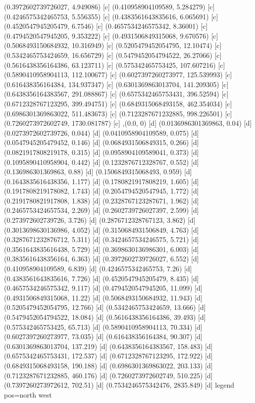 {{{(0.3972602739726027, 4.949086) [c] 
(0.410958904109589, 5.284279) [c] 
(0.4246575342465753, 5.556355) [c] 
(0.4383561643835616, 6.065691) [c] 
(0.4520547945205479, 6.7546) [c] 
(0.4657534246575342, 8.36001) [c] 
(0.4794520547945205, 9.353222) [c] 
(0.4931506849315068, 9.670576) [c] 
(0.5068493150684932, 10.316949) [c] 
(0.5205479452054795, 12.10474) [c] 
(0.5342465753424659, 16.656729) [c] 
(0.5479452054794522, 26.27066) [c] 
(0.5616438356164386, 63.123711) [c] 
(0.575342465753425, 107.607216) [c] 
(0.5890410958904113, 112.100677) [c] 
(0.6027397260273977, 125.539993) [c] 
(0.616438356164384, 134.937347) [c] 
(0.6301369863013704, 141.209305) [c] 
(0.6438356164383567, 291.088867) [c] 
(0.6575342465753431, 396.52594) [c] 
(0.6712328767123295, 399.494751) [c] 
(0.6849315068493158, 462.354034) [c] 
(0.6986301369863022, 511.483673) [c] 
(0.7123287671232885, 998.226501) [c] 
(0.7260273972602749, 1730.081787) [c] 
},{(0.0, 0) [d] 
(0.0136986301369863, 0.04) [d] 
(0.0273972602739726, 0.044) [d] 
(0.0410958904109589, 0.075) [d] 
(0.0547945205479452, 0.146) [d] 
(0.0684931506849315, 0.266) [d] 
(0.0821917808219178, 0.315) [d] 
(0.0958904109589041, 0.373) [d] 
(0.1095890410958904, 0.442) [d] 
(0.1232876712328767, 0.552) [d] 
(0.136986301369863, 0.88) [d] 
(0.1506849315068493, 0.959) [d] 
(0.1643835616438356, 1.177) [d] 
(0.1780821917808219, 1.605) [d] 
(0.1917808219178082, 1.743) [d] 
(0.2054794520547945, 1.772) [d] 
(0.2191780821917808, 1.838) [d] 
(0.2328767123287671, 1.962) [d] 
(0.2465753424657534, 2.269) [d] 
(0.2602739726027397, 2.599) [d] 
(0.273972602739726, 3.726) [d] 
(0.2876712328767123, 3.862) [d] 
(0.3013698630136986, 4.052) [d] 
(0.3150684931506849, 4.763) [d] 
(0.3287671232876712, 5.311) [d] 
(0.3424657534246575, 5.721) [d] 
(0.3561643835616438, 5.729) [d] 
(0.3698630136986301, 6.003) [d] 
(0.3835616438356164, 6.363) [d] 
(0.3972602739726027, 6.552) [d] 
(0.410958904109589, 6.839) [d] 
(0.4246575342465753, 7.26) [d] 
(0.4383561643835616, 7.726) [d] 
(0.4520547945205479, 8.435) [d] 
(0.4657534246575342, 9.117) [d] 
(0.4794520547945205, 11.099) [d] 
(0.4931506849315068, 11.22) [d] 
(0.5068493150684932, 11.943) [d] 
(0.5205479452054795, 12.766) [d] 
(0.5342465753424659, 13.666) [d] 
(0.5479452054794522, 18.084) [d] 
(0.5616438356164386, 39.493) [d] 
(0.575342465753425, 65.713) [d] 
(0.5890410958904113, 70.334) [d] 
(0.6027397260273977, 73.035) [d] 
(0.616438356164384, 90.307) [d] 
(0.6301369863013704, 137.219) [d] 
(0.6438356164383567, 158.483) [d] 
(0.6575342465753431, 172.537) [d] 
(0.6712328767123295, 172.922) [d] 
(0.6849315068493158, 190.188) [d] 
(0.6986301369863022, 203.133) [d] 
(0.7123287671232885, 460.176) [d] 
(0.7260273972602749, 510.225) [d] 
(0.7397260273972612, 702.51) [d] 
(0.7534246575342476, 2835.849) [d] 
}}}{legend pos=north west}